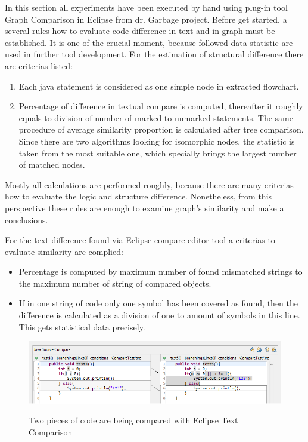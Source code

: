 \documentclass{report}
\begin{document}
In this section all experiments have been executed by hand using plug-in tool Graph Comparison in Eclipse from dr. Garbage project. Before get started, a several rules how to evaluate code difference in text and in graph must be established. It is one of the crucial moment, because followed data statistic are used in further tool development. For the estimation of structural difference there are criterias listed:
\begin{enumerate}
	\item Each java statement is considered as one simple node in extracted flowchart.
	\item Percentage of difference in textual compare is computed, thereafter it roughly equals to division of number of marked to unmarked statements. The same procedure of average similarity proportion is calculated after tree comparison. Since there are two algorithms looking for isomorphic nodes, the statistic is taken from the most suitable one, which specially brings the largest number of matched nodes.
\end{enumerate}

Mostly all calculations are performed roughly, because there are many criterias how to evaluate the logic and structure difference. Nonetheless, from this perspective these rules are enough to examine graph's similarity and make a conclusions.

For the text difference found via Eclipse compare editor tool a criterias to evaluate similarity are complied:
\begin{itemize}
	\item Percentage is computed by maximum number of found mismatched strings to the maximum number of string of compared objects.
	\item If in one string of code only one symbol has been covered as found, then the difference is calculated as a division of one to amount of symbols in this line. This gets statistical data precisely.
\end{itemize}

\begin{figure}[h]
  \centering
  \includegraphics[scale = 0.5]{Figures/Java-flowchart-exp/example-graph.png}\\[0.1cm]
  \caption[Two pieces of code are compared with Eclipse text compare editor]{Two pieces of code are being compared with Eclipse Text Comparison}
  \label{fig:example-graph}
\end{figure}
\end{document}
